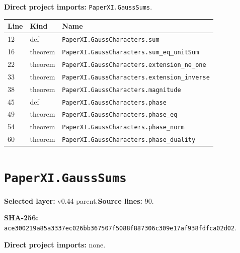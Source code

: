 \documentclass[10pt,oneside]{book}
\begin{document}

\textbf{Direct project imports:} \nolinkurl{PaperXI.GaussSums}.

\begin{longtable}{@{}p{}p{}p{}@{}}\toprule Line&Kind&Name\\\midrule\endhead

12&def&\nolinkurl{PaperXI.GaussCharacters.sum}\\

16&theorem&\nolinkurl{PaperXI.GaussCharacters.sum_eq_unitSum}\\

22&theorem&\nolinkurl{PaperXI.GaussCharacters.extension_ne_one}\\

33&theorem&\nolinkurl{PaperXI.GaussCharacters.extension_inverse}\\

38&theorem&\nolinkurl{PaperXI.GaussCharacters.magnitude}\\

45&def&\nolinkurl{PaperXI.GaussCharacters.phase}\\

49&theorem&\nolinkurl{PaperXI.GaussCharacters.phase_eq}\\

54&theorem&\nolinkurl{PaperXI.GaussCharacters.phase_norm}\\

60&theorem&\nolinkurl{PaperXI.GaussCharacters.phase_duality}\\

\bottomrule\end{longtable}

\section{\texorpdfstring{\nolinkurl{PaperXI.GaussSums}}{PaperXI.GaussSums}}\label{module:PaperXI.GaussSums}

\textbf{Selected layer:} v0.44 parent.\quad\textbf{Source lines:} 90.\par\textbf{SHA-256:} {\scriptsize\nolinkurl{ace300219a85a3337ec026bb367507f5088f887306c309e17af938fdfca02d02}}.


\textbf{Direct project imports:} none.
\end{document}
